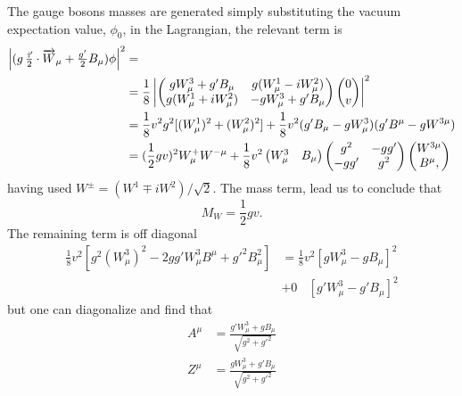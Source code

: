 The gauge bosons masses are generated simply substituting the vacuum
expectation value, $\phi_{0}$, in the Lagrangian, the relevant term is
\begin{equation}
  \label{eq:48}
  \begin{split}
    \left| ( g\,\tfrac{\vec \tau}{2} \cdot \overrightarrow{W}_{\mu} +
      \tfrac{g'}{2}
      B_{\mu}) \phi \right|^{2} &= \\
    &= \frac{1}{8} \left|
      \begin{pmatrix}
        g W^{3}_{\mu} + g' B_{\mu} & g(W^{1}_{\mu} - i W^{2}_{\mu}) \\
        g(W^{1}_{\mu} + iW^{2}_{\mu}) & -g W^{3}_{\mu} + g' B_{\mu}
      \end{pmatrix}
      \binom{0}{v} \right|^{2} \\
    &= \frac{1}{8} v^{2}g^{2} [(W^{1}_{\mu})^{2} + (W^{2}_{\mu})^{2}]
    + \frac{1}{8} v^{2}(g' B_{\mu} - g W_{\mu}^{3})( g' B^{\mu} - g
    W^{3
      \mu}) \\
    &= (\frac{1}{2} gv)^{2} W^{+}_{\mu}W^{- \mu} + \frac{1}{8} v^{2}
    \begin{pmatrix}
      W_{\mu}^{3} & B_{\mu}
    \end{pmatrix}
    \begin{pmatrix}
      g^{2} & - g g' \\
      - g g' & g^{2}
    \end{pmatrix}
    \begin{pmatrix}
      W^{3 \mu} \\ B^{\mu},
    \end{pmatrix}
  \end{split}
\end{equation}
having used $W^{\pm} = ( W^{1} \mp i W^{2} ) / \sqrt{2}$. The mass
term, lead us to conclude that
\begin{equation}
  \label{eq:49}
  M_{W} = \frac{1}{2} g v.
\end{equation}
The remaining term is off diagonal
\begin{equation}
  \label{eq:50}
  \begin{split}
    \frac{1}{8} v^{2} [g^{2} (W_{\mu}^{3})^{2} - 2 g g' W_{\mu}^{3}
    B^{\mu} + g'^{2} B_{\mu}^{2} ] &= \frac{1}{8} v^{2} [g
    W^{3}_{\mu} - g B_{\mu} ]^{2} \\
    \quad &+ 0 \phantom{v^{2}} [g' W^{3}_{\mu} - g' B_{\mu} ]^{2}
  \end{split}
\end{equation}
but one can diagonalize and find that
\begin{equation}
  \label{eq:51}
  \begin{split}
    A^{\mu} &= \frac{g' W_{\mu}^{3} + g B_{\mu}}{\sqrt{g^{2} +
        g'^{2}}} \\
    Z^{\mu} &= \frac{g W_{\mu}^{3} + g' B_{\mu}}{\sqrt{g^{2} +
        g'^{2}}}
  \end{split}
\end{equation}
